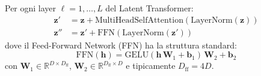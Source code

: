 \documentclass[12pt,a4paper]{article}
\begin{document}
\begin{formulabox}
Per ogni layer $\ell = 1, \ldots, L$ del Latent Transformer:
\begin{align}
    \mathbf{z}' &= \mathbf{z} + \text{MultiHeadSelfAttention}\!\left(\text{LayerNorm}(\mathbf{z})\right) \label{eq:lt_sa} \\[4pt]
    \mathbf{z}'' &= \mathbf{z}' + \text{FFN}\!\left(\text{LayerNorm}(\mathbf{z}')\right) \label{eq:lt_ffn}
\end{align}
dove il Feed-Forward Network (FFN) ha la struttura standard:
\[
    \text{FFN}(\mathbf{h}) = \text{GELU}\!\left(\mathbf{h}\,\mathbf{W}_1 + \mathbf{b}_1\right)\,\mathbf{W}_2 + \mathbf{b}_2
\]
con $\mathbf{W}_1 \in \mathbb{R}^{D \times D_{\text{ff}}}$, $\mathbf{W}_2 \in \mathbb{R}^{D_{\text{ff}} \times D}$ e tipicamente $D_{\text{ff}} = 4D$.
\end{formulabox}
\end{document}
